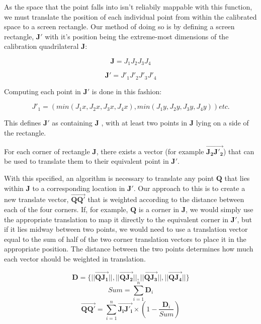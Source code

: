 As the space that the point falls into isn't reliabily mappable with this function, we must translate the position of each individual point from within the calibrated space to a screen rectangle. Our method of doing so is by defining a screen rectangle, \(\mathbf{J'}\) with it's position being the extreme-most dimensions of the calibration quadrilateral \(\mathbf{J}\):

\begin{equation}
\mathbf{J} = J_1 J_2 J_3 J_4
\end{equation}

\begin{equation}
\mathbf{J'} = J'_1 J'_2 J'_3 J'_4
\end{equation}

Computing each point in \(\mathbf{J'}\) is done in this fashion:

\begin{equation}
J'_1 = (min(J_1x, J_2x, J_3x, J_4x), min(J_1y, J_2y, J_3y, J_4y)) etc.
\end{equation}

This defines \(\mathbf{J'}\) as containing \(\mathbf{J}\) , with at least two points in \(\mathbf{J}\) lying on a side of the rectangle.

For each corner of rectangle \(\mathbf{J}\), there exists a vector (for example \(\vec{\mathbf{J_2 J'_2}}\)) that can be used to translate them to their equivalent point in \(\mathbf{J'}\).

With this specified, an algorithm is necessary to translate any point \(\mathbf{Q}\) that lies within \(\mathbf{J}\) to a corresponding location in \(\mathbf{J'}\). Our approach to this is to create a new translate vector, \(\mathbf{\vec{QQ'}}\) that is weighted according to the distance between each of the four corners. If, for example,  \(\mathbf{Q}\) is a corner in \(\mathbf{J}\), we would simply use the appropriate translation to map it directly to the equivalent corner in \(\mathbf{J'}\), but if it lies midway between two points, we would need to use a translation vector equal to the sum of half of the two corner translation vectors to place it in the appropriate position. The distance between the two points determines how much each vector should be weighted in translation.

\begin{equation}
\mathbf{D} = \{||\mathbf{\vec{QJ_1}}||, ||\mathbf{\vec{QJ_2}}||, ||\mathbf{\vec{QJ_3}}||, ||\mathbf{\vec{QJ_4}}||\} 
\end{equation}
\begin{equation}
Sum = \sum^{n}_{i=1} \mathbf{D}_i
\end{equation}
\begin{equation}
\mathbf{\vec{QQ'}} = \sum^{n}_{i=1} \mathbf{\vec{J_i J'_i}} \times (1 - \frac{\mathbf{D}_i} {Sum})
\end{equation}



